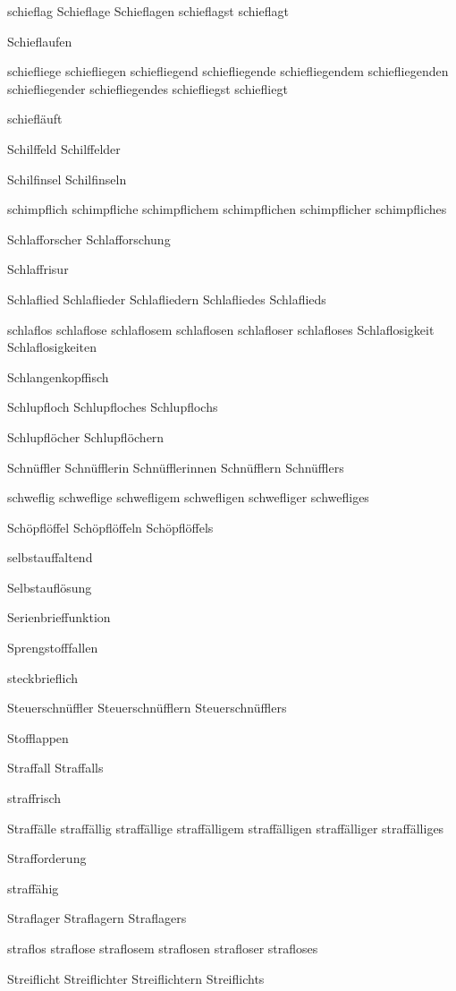 schieflag Schieflage Schieflagen schieflagst schieflagt

Schieflaufen

schiefliege schiefliegen schiefliegend schiefliegende schiefliegendem schiefliegenden schiefliegender schiefliegendes schiefliegst schiefliegt

schiefläuft

Schilffeld Schilffelder %

Schilfinsel Schilfinseln

schimpflich schimpfliche schimpflichem schimpflichen schimpflicher schimpfliches

Schlafforscher Schlafforschung

Schlaffrisur 

Schlaflied Schlaflieder Schlafliedern Schlafliedes Schlaflieds

schlaflos schlaflose schlaflosem schlaflosen schlafloser schlafloses Schlaflosigkeit Schlaflosigkeiten

Schlangenkopffisch

Schlupfloch Schlupfloches Schlupflochs

Schlupflöcher Schlupflöchern

Schnüffler Schnüfflerin Schnüfflerinnen Schnüfflern Schnüfflers

schweflig schweflige schwefligem schwefligen schwefliger schwefliges

Schöpflöffel Schöpflöffeln Schöpflöffels

selbstauffaltend

Selbstauflösung

Serienbrieffunktion

Sprengstofffallen

steckbrieflich

Steuerschnüffler Steuerschnüfflern Steuerschnüfflers

Stofflappen

Straffall Straffalls

straffrisch

Straffälle straffällig straffällige straffälligem straffälligen straffälliger straffälliges

Strafforderung

straffähig

Straflager Straflagern Straflagers

straflos straflose straflosem straflosen strafloser strafloses

Streiflicht Streiflichter Streiflichtern Streiflichts


